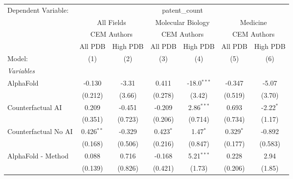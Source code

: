\begingroup
\centering
\begin{tabular}{lcccccc}
   \tabularnewline \midrule \midrule
   Dependent Variable: & \multicolumn{6}{c}{patent\_count}\\
 & \multicolumn{2}{c}{All Fields} & \multicolumn{2}{c}{Molecular Biology} & \multicolumn{2}{c}{Medicine} \\
\cmidrule(lr){2-3} \cmidrule(lr){4-5} \cmidrule(lr){6-7}
 & \multicolumn{2}{c}{CEM Authors} & \multicolumn{2}{c}{CEM Authors} & \multicolumn{2}{c}{CEM Authors} \\
\cmidrule(lr){2-3} \cmidrule(lr){4-5} \cmidrule(lr){6-7}
 & \multicolumn{1}{c}{All PDB} & \multicolumn{1}{c}{High PDB} & \multicolumn{1}{c}{All PDB} & \multicolumn{1}{c}{High PDB} & \multicolumn{1}{c}{All PDB} & \multicolumn{1}{c}{High PDB} \\
\cmidrule(lr){2-2} \cmidrule(lr){3-3} \cmidrule(lr){4-4} \cmidrule(lr){5-5} \cmidrule(lr){6-6} \cmidrule(lr){7-7}
   Model:                                                     & (1)          & (2)           & (3)           & (4)           & (5)         & (6)\\  
   \midrule
   \emph{Variables}\\
   AlphaFold                                                  & -0.130       & -3.31         & 0.411         & -18.0$^{***}$ & -0.347      & -5.07\\   
                                                              & (0.212)      & (3.66)        & (0.278)       & (3.42)        & (0.519)     & (3.70)\\   
   Counterfactual AI                                          & 0.209        & -0.451        & -0.209        & 2.86$^{***}$  & 0.693       & -2.22$^{*}$\\   
                                                              & (0.351)      & (0.723)       & (0.206)       & (0.714)       & (0.734)     & (1.17)\\   
   Counterfactual No AI                                       & 0.426$^{**}$ & -0.329        & 0.423$^{*}$   & 1.47$^{*}$    & 0.329$^{*}$ & -0.892\\   
                                                              & (0.168)      & (0.506)       & (0.216)       & (0.847)       & (0.177)     & (0.583)\\   
   AlphaFold - Method                                         & 0.088        & 0.716         & -0.168        & 5.21$^{***}$  & 0.228       & 2.94\\   
                                                              & (0.139)      & (0.826)       & (0.421)       & (1.73)        & (0.206)     & (1.85)\\   

\end{tabular}

